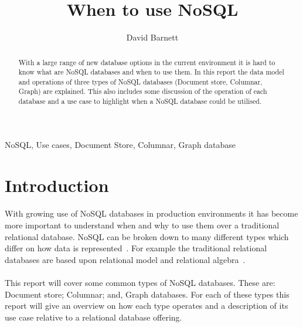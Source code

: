 \documentclass{CRPITStyle}
\renewcommand{\cite}{\citep}
\begin{document}
\title{When to use NoSQL}
\author{David Barnett}

\maketitle

\begin{abstract}
    With a large range of new database options in the current environment it
    is hard to know what are NoSQL databases and when to use them.
    In this report the data model and operations of three types of NoSQL
    databases (Document store, Columnar, Graph) are explained.
    This also includes some discussion of the operation of each database
    and a use case to highlight when a NoSQL database could be utilised.
\end{abstract}

\vspace{.1in}

 NoSQL, Use cases, Document Store, Columnar, Graph database

\section{Introduction}

\paragraph{}
With growing use of NoSQL databases in production environments it has become more
important to understand when and why to use them over a traditional
relational database.
NoSQL can be broken down to many different types which differ on how
data is represented~\cite{type_nosql}.
For example the traditional relational databases are based upon relational
model and relational algebra~\cite{relational_db}.

\paragraph{}
This report will cover some common types of NoSQL databases.
These are: Document store; Columnar; and, Graph databases.
For each of these types this report will give an overview on how each type
operates and a description of its use case relative to a relational database
offering.
\end{document}
